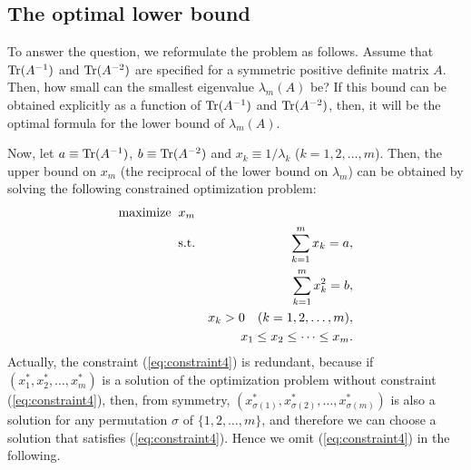\documentclass{amsart}
\begin{document}
\subsection{The optimal lower bound}
To answer the question, we reformulate the problem as follows. Assume that ${\rm Tr}(A^{-1})$ and ${\rm Tr}(A^{-2})$ are specified for a symmetric positive definite matrix $A$. Then, how small can the smallest eigenvalue $\lambda_m(A)$ be? If this bound can be obtained explicitly as a function of ${\rm Tr}(A^{-1})$ and ${\rm Tr}(A^{-2})$, then, it will be the optimal formula for the lower bound of $\lambda_m(A)$.

Now, let $a\equiv{\rm Tr}(A^{-1})$, $b\equiv{\rm Tr}(A^{-2})$ and $x_k\equiv 1/\lambda_k$ ($k=1, 2, \ldots, m$). Then, the upper bound on $x_m$ (the reciprocal of the lower bound on $\lambda_m$) can be obtained by solving the following constrained optimization problem:
\begin{eqnarray}
{\rm maximize} \;\; x_m && \label{eq:objective} \\
{\rm s.t.} && \sum_{k=1}^m x_k = a, \label{eq:constraint1} \\
&& \sum_{k=1}^m x_k^2 = b, \label{eq:constraint2} \\
&& x_k > 0 \quad(k=1, 2, \ldots, m), \label{eq:constraint3} \\
&& x_1 \le x_2 \le \cdots \le x_m. \label{eq:constraint4}
\label{eq:inequality}
\end{eqnarray}
Actually, the constraint (\ref{eq:constraint4}) is redundant, because if $(x_1^*, x_2^*, \ldots, x_m^*)$ is a solution of the optimization problem without constraint (\ref{eq:constraint4}), then, from symmetry, $(x_{\sigma(1)}^*, x_{\sigma(2)}^*, \ldots, x_{\sigma(m)}^*)$ is also a solution for any permutation $\sigma$ of $\{1, 2, \ldots, m\}$, and therefore we can choose a solution that satisfies (\ref{eq:constraint4}). Hence we omit (\ref{eq:constraint4}) in the following.
\end{document}
